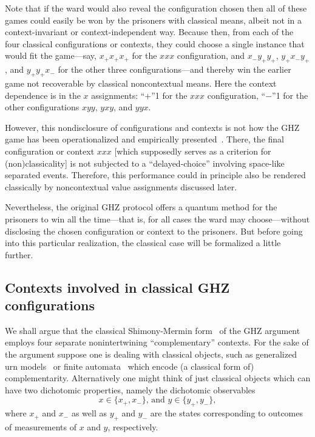 \documentclass[sn-mathphys]{sn-jnl}%
\theoremstyle{thmstyleone}%
\theoremstyle{thmstyletwo}%
\theoremstyle{thmstylethree}%
\begin{document}
Note that if the ward would also reveal the configuration chosen then all of these games could easily be won by the prisoners
with classical means,
albeit not in a context-invariant or context-independent way.
Because then, from each of the four classical configurations or contexts, they could choose a single instance that would fit
the game---say, $x_+x_+x_+$ for the $xxx$ configuration, and $x_-y_+y_+$, $y_+x_-y_+$, and $y_+y_+x_-$ for the other three configurations---and thereby
win the earlier game not recoverable by classical noncontextual means.
Here the context dependence is in the $x$ assignments: ``$+$''1 for the $xxx$ configuration, ``$-$''1
for the other configurations $xyy$, $yxy$, and $yyx$.

However, this nondisclosure of configurations and contexts is not how the GHZ game has been operationalized and empirically presented~\cite{PhysRevLett.82.1345,panbdwz}.
There, the final configuration or context $xxx$ [which supposedly serves as a criterion for (non)classicality]
is not subjected to a ``delayed-choice'' involving space-like separated events.
Therefore, this performance could in principle also be rendered classically by noncontextual value assignments discussed later.


Nevertheless, the original GHZ protocol offers a quantum method for the prisoners to win all the time---that is, for all cases
the ward may choose---without disclosing the chosen configuration or context to the prisoners.
But before going into this particular realization, the classical case will be formalized a little further.

\subsection{Contexts involved in classical GHZ configurations}


We shall argue that the classical Shimony-Mermin form~\cite{ghsz,mermin90b,mermin} of the GHZ argument employs four separate nonintertwining ``complementary'' contexts.
For the sake of the argument suppose one is dealing with classical objects, such as generalized urn models~\cite{wright} or finite automata~\cite{svozil-2001-eua,svozil-2018-b}
which encode (a classical form of) complementarity.
Alternatively one might think of just classical objects which can have two dichotomic properties, namely
the dichotomic observables
\begin{equation}
{{x}} \in \{x_+,x_-\}     \textrm{, and }  {{y}} \in \{y_+,y_-\}
,
\label{2020-ghz-hl}
\end{equation}
where $x_+$ and $x_-$ as well as $y_+$ and $y_-$ are the states corresponding to outcomes of measurements of ${{x}}$ and ${{y}}$, respectively.
\end{document}

